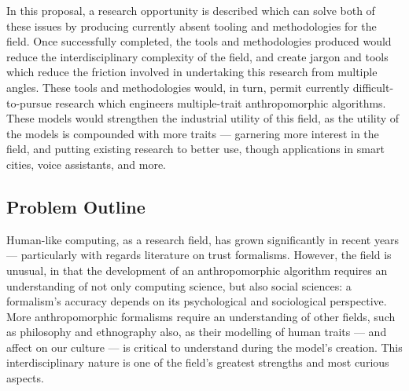 In this proposal, a research opportunity is described which can solve both of these issues by producing currently absent tooling and methodologies for the field. Once successfully completed, the tools and methodologies produced would reduce the interdisciplinary complexity of the field, and create jargon and tools which reduce the friction involved in undertaking this research from multiple angles. These tools and methodologies would, in turn, permit currently difficult-to-pursue research which engineers multiple-trait anthropomorphic algorithms. These models would strengthen the industrial utility of this field, as the utility of the models is compounded with more traits --- garnering more interest in the field, and putting existing research to better use, though applications in smart cities, voice assistants, and more.\par

\subsection{Problem Outline}\label{sec:problem_outline}




Human-like computing, as a research field, has grown significantly in recent years --- particularly with regards literature on trust formalisms. However, the field is unusual, in that the development of an anthropomorphic algorithm requires an understanding of not only computing science, but also social sciences: a formalism's accuracy depends on its psychological and sociological perspective. More anthropomorphic formalisms require an understanding of other fields, such as philosophy and ethnography also, as their modelling of human traits --- and affect on our culture --- is critical to understand during the model's creation. This interdisciplinary nature is one of the field's greatest strengths and most curious aspects.\par

